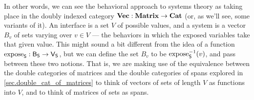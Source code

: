 \documentclass[DynamicalBook]{subfiles}
\begin{document}
In other words, we can see the behavioral approach to systems theory as taking
place in the doubly indexed category $\textbf{Vec} : \textbf{Matrix} \to \textbf{Cat}$
(or, as we'll see, some variants of it). An interface is a set $V$ of possible
values, and a system is a vector $B_v$ of sets varying over $v \in V$ --- the behaviors in
which the exposed variables take that given value. This might sound a bit
different from the idea of a function $\mathrm{expose}_{\mathsf{S}} : \mathsf{B}_{\mathsf{S}} \to
\mathsf{V}_{\mathsf{S}}$, but we can define the set $B_v$ to be $\mathrm{expose}_{\mathsf{S}}^{-1}(v)$,
and pass between these two notions. That is, we are making use of the
equivalence between the double categories of matrices and the double categories
of spans explored in \cref{sec.double_cat_of_matrices} to think of vectors of
sets of length $V$ as functions into $V$, and to think of matrices of sets as spans.
\end{document}
